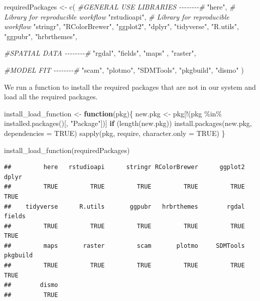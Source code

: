 \documentclass[
]{book}
\newenvironment{Shaded}{\begin{snugshade}}{\end{snugshade}}
\newcommand{\AttributeTok}[1]{\textcolor[rgb]{0.77,0.63,0.00}{#1}}
\newcommand{\CommentTok}[1]{\textcolor[rgb]{0.56,0.35,0.01}{\textit{#1}}}
\newcommand{\ConstantTok}[1]{\textcolor[rgb]{0.00,0.00,0.00}{#1}}
\newcommand{\ControlFlowTok}[1]{\textcolor[rgb]{0.13,0.29,0.53}{\textbf{#1}}}
\newcommand{\FunctionTok}[1]{\textcolor[rgb]{0.00,0.00,0.00}{#1}}
\newcommand{\NormalTok}[1]{#1}
\newcommand{\OtherTok}[1]{\textcolor[rgb]{0.56,0.35,0.01}{#1}}
\newcommand{\SpecialCharTok}[1]{\textcolor[rgb]{0.00,0.00,0.00}{#1}}
\newcommand{\StringTok}[1]{\textcolor[rgb]{0.31,0.60,0.02}{#1}}
\begin{document}
\begin{Shaded}
\begin{Highlighting}[]
\NormalTok{requiredPackages }\OtherTok{\textless{}{-}} \FunctionTok{c}\NormalTok{(}
  \CommentTok{\#GENERAL USE LIBRARIES {-}{-}{-}{-}{-}{-}{-}{-}\#}
  \StringTok{"here"}\NormalTok{, }\CommentTok{\# Library for reproducible workflow}
  \StringTok{"rstudioapi"}\NormalTok{,  }\CommentTok{\# Library for reproducible workflow}
  \StringTok{"stringr"}\NormalTok{,}
  \StringTok{"RColorBrewer"}\NormalTok{,  }
  \StringTok{"ggplot2"}\NormalTok{,}
  \StringTok{"dplyr"}\NormalTok{,}
  \StringTok{"tidyverse"}\NormalTok{,}
  \StringTok{"R.utils"}\NormalTok{,}
  \StringTok{"ggpubr"}\NormalTok{,}
  \StringTok{"hrbrthemes"}\NormalTok{,}
  
  \CommentTok{\#SPATIAL DATA {-}{-}{-}{-}{-}{-}{-}{-}\#}
  \StringTok{"rgdal"}\NormalTok{,}
  \StringTok{"fields"}\NormalTok{,}
  \StringTok{"maps"}\NormalTok{ ,}
  \StringTok{"raster"}\NormalTok{,}

  \CommentTok{\#MODEL FIT {-}{-}{-}{-}{-}{-}{-}{-}\#}
  \StringTok{"scam"}\NormalTok{,}
  \StringTok{"plotmo"}\NormalTok{,}
  \StringTok{"SDMTools"}\NormalTok{,}
  \StringTok{"pkgbuild"}\NormalTok{,}
  \StringTok{"dismo"}
\NormalTok{  )}
\end{Highlighting}
\end{Shaded}

We run a function to install the required packages that are not in our system and load all the required packages.

\begin{Shaded}
\begin{Highlighting}[]
\NormalTok{install\_load\_function }\OtherTok{\textless{}{-}} \ControlFlowTok{function}\NormalTok{(pkg)\{}
\NormalTok{  new.pkg }\OtherTok{\textless{}{-}}\NormalTok{ pkg[}\SpecialCharTok{!}\NormalTok{(pkg }\SpecialCharTok{\%in\%} \FunctionTok{installed.packages}\NormalTok{()[, }\StringTok{"Package"}\NormalTok{])]}
  \ControlFlowTok{if}\NormalTok{ (}\FunctionTok{length}\NormalTok{(new.pkg))}
    \FunctionTok{install.packages}\NormalTok{(new.pkg, }\AttributeTok{dependencies =} \ConstantTok{TRUE}\NormalTok{)}
  \FunctionTok{sapply}\NormalTok{(pkg, require, }\AttributeTok{character.only =} \ConstantTok{TRUE}\NormalTok{)}
\NormalTok{\}}

\FunctionTok{install\_load\_function}\NormalTok{(requiredPackages)}
\end{Highlighting}
\end{Shaded}

\begin{verbatim}
##         here   rstudioapi      stringr RColorBrewer      ggplot2        dplyr 
##         TRUE         TRUE         TRUE         TRUE         TRUE         TRUE 
##    tidyverse      R.utils       ggpubr   hrbrthemes        rgdal       fields 
##         TRUE         TRUE         TRUE         TRUE         TRUE         TRUE 
##         maps       raster         scam       plotmo     SDMTools     pkgbuild 
##         TRUE         TRUE         TRUE         TRUE         TRUE         TRUE 
##        dismo 
##         TRUE
\end{verbatim}
\end{document}
